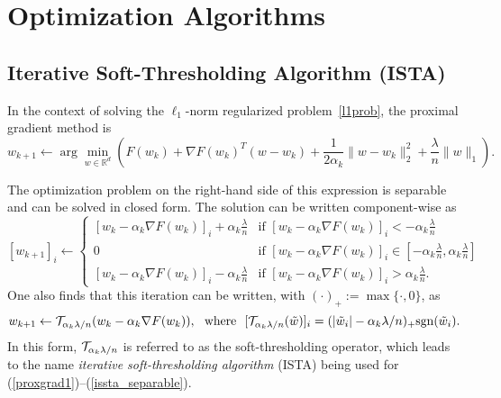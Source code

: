 \documentclass[conference,onecolumn,12pt]{IEEEtran}
\renewcommand{\(}{\left(}
\renewcommand{\)}{\right)}
\numberwithin{equation}{section}
\numberwithin{figure}{section}
\numberwithin{table}{section}
\theoremstyle{definition}
\begin{document}
\section{Optimization Algorithms}
\subsection{Iterative Soft-Thresholding Algorithm (ISTA)}   \label{istasection}
In the context of solving the $\ell_1$-norm regularized problem~\ref{l1prob}, the proximal gradient method is
\begin{equation}\label{proxgrad1}
  w_{k+1} \gets \arg\min_{w\in\mathbb{R}^{d}} \(F(w_k) + \nabla F(w_k)^T(w - w_k) + \frac{1}{2\alpha_k}\|w - w_k\|_2^2 +  \frac{\lambda}{n}\| w \|_1\).
\end{equation}

The optimization problem on the right-hand side of this expression is separable and can be solved in closed form.  The solution can be written component-wise as
\begin{equation}\label{issta_separable}
  [w_{k+1}]_i \gets \begin{cases}
    [w_k - \alpha_k\nabla F(w_k)]_i + \alpha_k \frac{\lambda}{n} & \text{if $[w_k - \alpha_k\nabla F(w_k)]_i < -\alpha_k \frac{\lambda}{n}$} \\ 0 & \text{if $[w_k - \alpha_k\nabla F(w_k)]_i \in [-\alpha_k \frac{\lambda}{n},\alpha_k \frac{\lambda}{n}]$} \\ [w_k - \alpha_k\nabla F(w_k)]_i - \alpha_k \frac{\lambda}{n} & \text{if $[w_k - \alpha_k\nabla F(w_k)]_i > \alpha_k \frac{\lambda}{n}$}.
  \end{cases}
\end{equation}
One also finds that this iteration can be written, with $(\cdot)_+ := \max\{\cdot,0\}$, as
\begin{equation}\label{issta}
  w_{k+1} \gets {\cal T}_{\alpha_k\lambda/n}(w_k - \alpha_k \nabla F(w_k)),\ \ \text{where}\ \ [{\cal T}_{\alpha_k\lambda/n}(\Tilde{w})]_i = (|\Tilde{w}_i| - \alpha_k\lambda/n)_+ \mathrm{sgn}(\Tilde{w}_i).
\end{equation}
In this form, ${\cal T}_{\alpha_k\lambda/n}$ is referred to as the soft-thresholding operator, which leads to the name \emph{iterative soft-thresholding algorithm} (ISTA) being used for (\ref{proxgrad1})--(\ref{issta_separable}).
\end{document}
